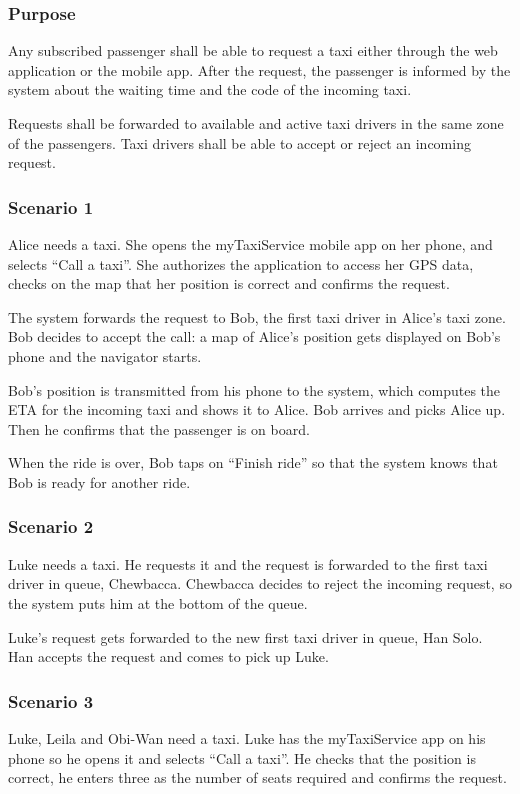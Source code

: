\label{standard-call}
\subsubsection{Purpose}

Any subscribed passenger shall be able to request a taxi either through the web application or the mobile app.
After the request, the passenger is informed by the system about the waiting time and the code of the incoming taxi.

Requests shall be forwarded to available and active taxi drivers in the same zone of the passengers. Taxi drivers shall be able to accept or reject an incoming request.

\subsubsection{Scenario 1}
Alice needs a taxi. She opens the myTaxiService mobile app on her phone, and selects ``Call a taxi''. She authorizes the application to access her GPS data, checks on the map that her position is correct and confirms the request.

The system forwards the request to Bob, the first taxi driver in Alice's taxi zone. Bob decides to accept the call: a map of Alice's position gets displayed on Bob's phone and the navigator starts.

Bob's position is transmitted from his phone to the system, which computes the ETA for the incoming taxi and shows it to Alice. Bob arrives and picks Alice up. Then he confirms that the passenger is on board.

When the ride is over, Bob taps on ``Finish ride'' so that the system knows that Bob is ready for another ride.

\subsubsection{Scenario 2}
Luke needs a taxi. He requests it and the request is forwarded to the first taxi driver in queue, Chewbacca. Chewbacca decides to reject the incoming request, so the system puts him at the bottom of the queue.

Luke's request gets forwarded to the new first taxi driver in queue, Han Solo. Han accepts the request and comes to pick up Luke.

\subsubsection{Scenario 3}
Luke, Leila and Obi-Wan need a taxi. Luke has the myTaxiService app on his phone so he opens it and selects ``Call a taxi''. He checks that the position is correct, he enters three as the number of seats required and confirms the request.


